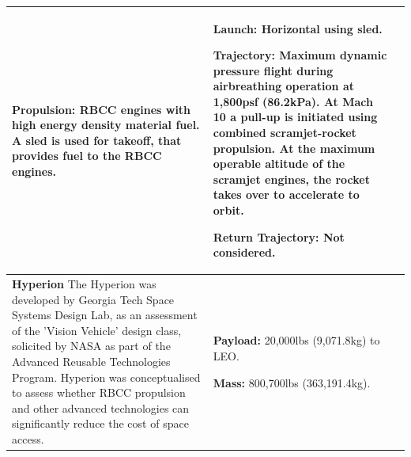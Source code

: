 {\begin{landscape}
\begin{xltabular}{\linewidth}{|X|X|X|}
			
			\textbf{Propulsion:} RBCC engines with high energy density material fuel. A sled is used for takeoff, that provides fuel to the RBCC engines. 
			
			&\small {}
			
			\textbf{Launch:} Horizontal using sled.
			
			\textbf{Trajectory:} Maximum dynamic pressure flight during airbreathing operation at 1,800psf (86.2kPa). At Mach 10 a pull-up is initiated using combined scramjet-rocket propulsion. At the maximum operable altitude of the scramjet engines, the rocket takes over to accelerate to orbit. 
			
			\textbf{Return Trajectory:} Not considered.  \\
			
			\hline \small\textbf{Hyperion}\cite{Hyperion}\newline \newline 
			The Hyperion was developed by Georgia Tech Space Systems Design Lab, as an assessment of the 'Vision Vehicle' design class, solicited by NASA as part of the Advanced Reusable Technologies Program. Hyperion was conceptualised to assess whether RBCC propulsion and other advanced technologies can significantly reduce the cost of space access. 
			&\small {}  
			
			\textbf{Payload:} 20,000lbs (9,071.8kg) to LEO. 
			
			\textbf{Mass:} 800,700lbs (363,191.4kg).
			

\end{xltabular}
\end{landscape}}
